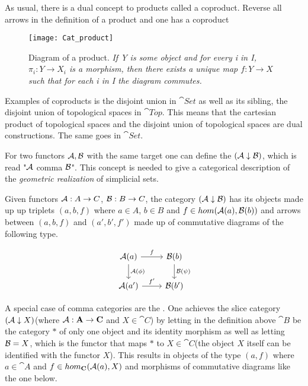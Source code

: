 \documentclass[../../main.tex]{subfiles}
\begin{document}
    As usual, there is a dual concept to products called a coproduct. Reverse all arrows in the definition of a product and one has a coproduct
    
    \begin{figure}[H]
        \centering
        \texttt{[image: Cat\_product]}
        \caption{Diagram of a product. \textit{If Y is some object and for every i in I, $\pi_i:Y\to X_i$ is a morphism, then there exists a unique map $f:Y\to X$ such that for each i in I the diagram commutes.}}
        \label{fig:product}
    \end{figure}

    Examples of coproducts is the disjoint union in $\cat{Set}$ as well as its sibling, the disjoint union of topological spaces in $\cat{Top}$. This means that the cartesian product of topological spaces and the disjoint union of topological spaces are dual constructions. The same goes in $\cat{Set}$.

    For two functors $\mathcal{A}, \mathcal{B}$ with the same target one can define the  $(\mathcal{A} \downarrow \mathcal{B})$, which is read "$\mathcal{A}$ comma $\mathcal{B}$". This concept is needed to give a categorical description of the \textit{geometric realization} of simplicial sets.

    \begin{definition}
        Given functors $\mathcal{A}: A \to C$, $\mathcal{B}: B \to C$, the category $(\mathcal{A} \downarrow \mathcal{B})$ has its objects made up up triplets $(a, b, f)$ where $a \in A$, $b \in B$ and $f \in hom(\mathcal{A}(a), \mathcal{B}(b))$ and arrows between $(a, b, f)$ and $(a', b', f')$ made up of commutative diagrams of the following type.
    \end{definition}

    \begin{figure}[H]
        \[
            \begin{tikzcd}
                \functor{A}(a) \arrow[r, "f"] \arrow[d, "\functor{A}(\phi)"]
                & \functor{B}(b) \arrow[d, "\functor{B}(\psi)"] \\
                \functor{A}(a') \arrow[r, "f'"]
                & \functor{B}(b')
            \end{tikzcd}
        \]
    \end{figure}

    A special case of comma categories are the . One achieves the slice category $(\mathcal{A} \downarrow X)$(where $\mathcal{A}: \mathbf{A} \to \mathbf{C}$ and $X \in \cat{C}$) by letting in the definition above $\cat{B}$ be the category $*$ of only one object and its identity morphism as well as letting $\mathcal{B}=X$, which is the functor that maps $*$ to $X \in \cat{C}$(the object $X$ itself can be identified with the functor $X$). This results in objects of the type $(a, f)$ where $a \in \cat{A}$ and $f \in hom_\mathbf{C}(\mathcal{A}(a), X)$ and morphisms of commutative diagrams like the one below.
\end{document}
